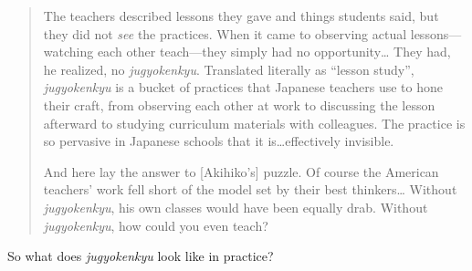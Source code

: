 \begin{quote}

  The teachers described lessons they gave and things students said,
  but they did not \emph{see} the practices. When it came to observing
  actual lessons---watching each other teach---they simply had no
  opportunity{\ldots} They had, he realized, no \emph{jugyokenkyu}.
  Translated literally as ``lesson study'', \emph{jugyokenkyu} is a
  bucket of practices that Japanese teachers use to hone their craft,
  from observing each other at work to discussing the lesson afterward
  to studying curriculum materials with colleagues. The practice is so
  pervasive in Japanese schools that it is{\ldots}effectively
  invisible.

  And here lay the answer to {[}Akihiko's{]} puzzle. Of course the
  American teachers' work fell short of the model set by their best
  thinkers{\ldots} Without \emph{jugyokenkyu}, his own classes would
  have been equally drab. Without \emph{jugyokenkyu}, how could you
  even teach?

\end{quote}

So what does \emph{jugyokenkyu} look like in practice?

